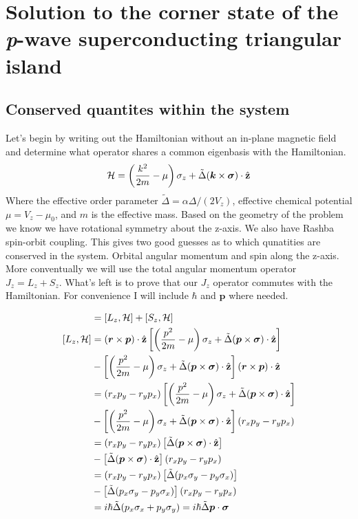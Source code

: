 \chapter{Solution to the corner state of the \textit{p}-wave superconducting triangular island}
\section{Conserved quantites within the system}

Let's begin by writing out the Hamiltonian without an in-plane magnetic field and determine what operator shares a common eigenbasis with the Hamiltonian.
\begin{equation}
  \Ham = \left(\dfrac{k^2}{2m} - \mu\right) \sigma_z + \tilde{\Delta} (\bm{k} \times \bm{\sigma}) \cdot \hat{z}
\end{equation}
Where the effective order parameter $\tilde{\Delta} = \alpha\Delta/(2V_z)$, effective chemical potential $\mu = V_z-\mu_0$, and $m$ is the effective mass. 
Based on the geometry of the problem we know we have rotational symmetry about the z-axis. 
We also have Rashba spin-orbit coupling.
This gives two good guesses as to which qunatities are conserved in the system.
Orbital angular momentum and spin along the z-axis. 
More conventually we will use the total angular momentum operator $J_z = L_z + S_z$.
What's left is to prove that our $J_z$ operator commutes with the Hamiltonian.
For convenience I will include $\hbar$ and $\bm{p}$ where needed.

\begin{align*}
  [J_z,\Ham] &= [L_z,\Ham] + [S_z,\Ham] \\
  [L_z,\Ham] &= (\bm{r}\times\bm{p})\cdot\hat{z}\left[\left(\dfrac{p^2}{2m} - \mu\right) \sigma_z + \tilde{\Delta} (\bm{p} \times \bm{\sigma}) \cdot \hat{z}\right] \\ 
  &-\left[\left(\dfrac{p^2}{2m} - \mu\right) \sigma_z + \tilde{\Delta} (\bm{p} \times \bm{\sigma}) \cdot \hat{z}\right](\bm{r}\times\bm{p})\cdot\hat{z} \\
  &= (r_xp_y-r_yp_x)\left[\left(\dfrac{p^2}{2m} - \mu\right) \sigma_z + \tilde{\Delta} (\bm{p} \times \bm{\sigma}) \cdot \hat{z}\right] \\ 
  &-\left[\left(\dfrac{p^2}{2m} - \mu\right) \sigma_z + \tilde{\Delta} (\bm{p} \times \bm{\sigma}) \cdot \hat{z}\right](r_xp_y-r_yp_x) \\
  &= (r_xp_y-r_yp_x)\left[\tilde{\Delta} (\bm{p} \times \bm{\sigma}) \cdot \hat{z}\right] \\ 
  &-\left[\tilde{\Delta} (\bm{p} \times \bm{\sigma}) \cdot \hat{z}\right](r_xp_y-r_yp_x) \\
  &= (r_xp_y-r_yp_x)\left[\tilde{\Delta} (p_x\sigma_y-p_y\sigma_x)\right] \\ 
  &-\left[\tilde{\Delta} (p_x\sigma_y-p_y\sigma_x)\right](r_xp_y-r_yp_x) \\
  &= i\hbar\tilde{\Delta} (p_x\sigma_x + p_y\sigma_y) = i\hbar\tilde{\Delta}\bm{p}\cdot\bm{\sigma}
\end{align*}

